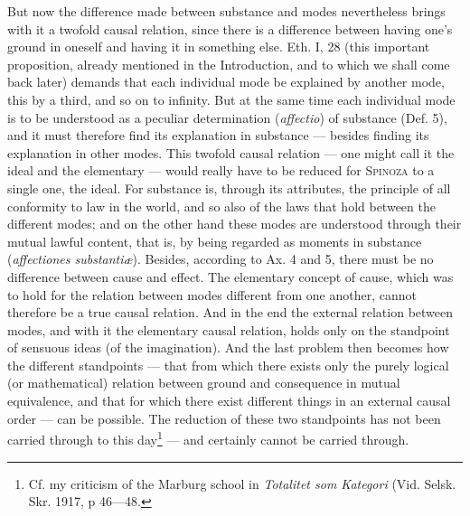 \documentclass[12pt]{article}
\begin{document}
But now the difference made between substance and modes nevertheless brings with it a
twofold causal relation, since there is a difference between having one's ground in
oneself and having it in something else. Eth. I, 28 (this important proposition,
already mentioned in the Introduction, and to which we shall come back later) demands
that each individual mode be explained by another mode, this by a third, and so on to
infinity. But at the same time each individual mode is to be understood as a peculiar
determination (\textit{affectio}) of substance (Def. 5), and it must therefore find
its explanation in substance --- besides finding its explanation in other modes. This
twofold causal relation --- one might call it the ideal and the elementary --- would
really have to be reduced for \textsc{Spinoza} to a single one, the ideal. For
substance is, through its attributes, the principle of all conformity to law in the
world, and so also of the laws that hold between the different modes; and on the
other hand these modes are understood through their mutual lawful content, that is,
by being regarded as moments in substance (\textit{affectiones substantiæ}).
Besides, according to Ax. 4 and 5, there must be no difference between cause and
effect. The elementary concept of cause, which was to hold for the relation between
modes different from one another, cannot therefore be a true causal relation. And in
the end the external relation between modes, and with it the elementary causal
relation, holds only on the standpoint of sensuous ideas (of the imagination). And the
last problem then becomes how the different standpoints --- that from which there
exists only the purely logical (or mathematical) relation between ground and
consequence in mutual equivalence, and that for which there exist different things in
an external causal order --- can be possible. The reduction of these two standpoints
has not been carried through to this day\footnote{Cf. my criticism of the Marburg
school in \textit{Totalitet som Kategori} (Vid. Selsk. Skr. 1917, p 46---48.} --- %
and certainly cannot be carried through.
\end{document}

